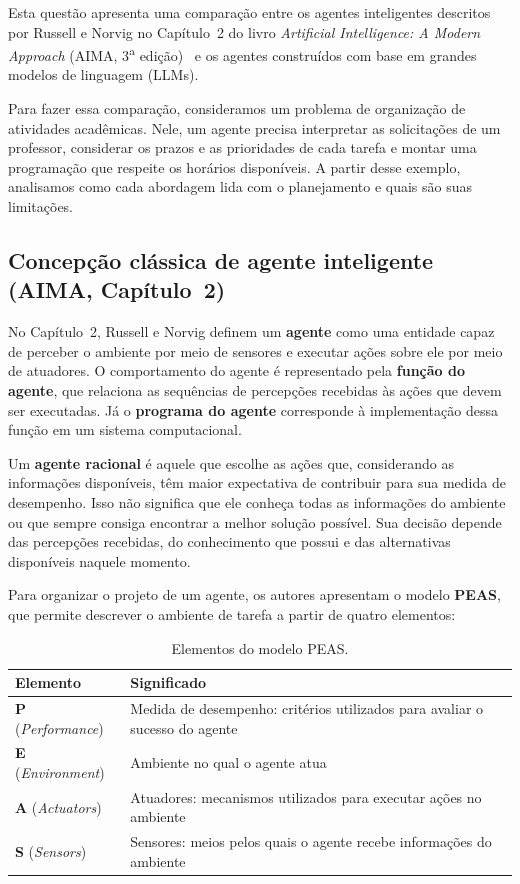 \documentclass[12pt, a4paper]{article}
\begin{document}
Esta questão apresenta uma comparação entre os agentes inteligentes descritos por Russell e Norvig no Capítulo~2 do livro \emph{Artificial Intelligence: A Modern Approach} (AIMA, 3\textsuperscript{a} edição)~\cite{russel2013} e os agentes construídos com base em grandes modelos de linguagem (LLMs).

Para fazer essa comparação, consideramos um problema de organização de atividades acadêmicas. Nele, um agente precisa interpretar as solicitações de um professor, considerar os prazos e as prioridades de cada tarefa e montar uma programação que respeite os horários disponíveis. A partir desse exemplo, analisamos como cada abordagem lida com o planejamento e quais são suas limitações.

\subsection{Concepção clássica de agente inteligente (AIMA, Capítulo~2)}

No Capítulo~2, Russell e Norvig definem um \textbf{agente} como uma entidade capaz de perceber o ambiente por meio de sensores e executar ações sobre ele por meio de atuadores. O comportamento do agente é representado pela \textbf{função do agente}, que relaciona as sequências de percepções recebidas às ações que devem ser executadas. Já o \textbf{programa do agente} corresponde à implementação dessa função em um sistema computacional.

Um \textbf{agente racional} é aquele que escolhe as ações que, considerando as informações disponíveis, têm maior expectativa de contribuir para sua medida de desempenho. Isso não significa que ele conheça todas as informações do ambiente ou que sempre consiga encontrar a melhor solução possível. Sua decisão depende das percepções recebidas, do conhecimento que possui e das alternativas disponíveis naquele momento.

Para organizar o projeto de um agente, os autores apresentam o modelo \textbf{PEAS}, que permite descrever o ambiente de tarefa a partir de quatro elementos:

\begin{table}[H]
  \centering
  \small
  \caption{Elementos do modelo PEAS.}
  \label{tab:q11_peas_def}
  \begin{tabular}{@{}p{2.6cm}p{11.0cm}@{}}
    \toprule
    \textbf{Elemento} & \textbf{Significado} \\
    \midrule
    \textbf{P} (\textit{Performance}) & Medida de desempenho: critérios utilizados para avaliar o sucesso do agente \\
    \textbf{E} (\textit{Environment}) & Ambiente no qual o agente atua \\
    \textbf{A} (\textit{Actuators}) & Atuadores: mecanismos utilizados para executar ações no ambiente \\
    \textbf{S} (\textit{Sensors}) & Sensores: meios pelos quais o agente recebe in\-for\-ma\-ções do ambiente \\
    \bottomrule
  \end{tabular}
\end{table}
\end{document}
